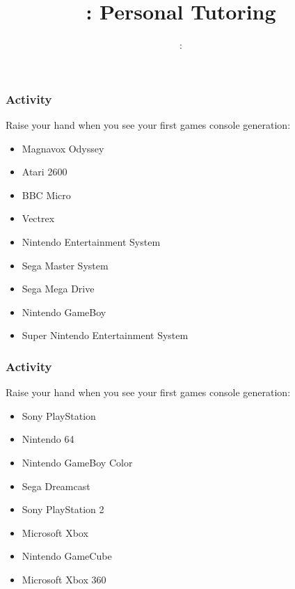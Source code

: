 \usepackage[T1]{fontenc}
\usepackage{../../beamerthemeFalmouthGamesAcademy}
\usepackage{multimedia}
\graphicspath{ {../../} }


\usepackage[normalem]{ulem}
\usepackage{wasysym}

\usepackage{pdfpages}

\usetikzlibrary{arrows,automata}




\title{\sessionnumber: Personal Tutoring}
\subtitle{\modulecode: \moduletitle}

\frame{\titlepage} 

\begin{frame}
	\frametitle{Activity}
	
	Raise your hand when you see your first games console generation:  \pause
	
	\begin{itemize}
		\item Magnavox Odyssey \pause
		\item Atari 2600 \pause
		\item BBC Micro \pause
		\item Vectrex \pause
		\item Nintendo Entertainment System \pause
		\item Sega Master System \pause
		\item Sega Mega Drive \pause
		\item Nintendo GameBoy \pause
		\item Super Nintendo Entertainment System

	\end{itemize}
\end{frame}

\begin{frame}
	\frametitle{Activity}
	
	Raise your hand when you see your first games console generation:
	
	\begin{itemize}
		\item Sony PlayStation \pause
		\item Nintendo 64 \pause
		\item Nintendo GameBoy Color \pause
		\item Sega Dreamcast \pause
		\item Sony PlayStation 2 \pause
		\item Microsoft Xbox \pause
		\item Nintendo GameCube \pause
		\item Microsoft Xbox 360 
	\end{itemize}
\end{frame}

